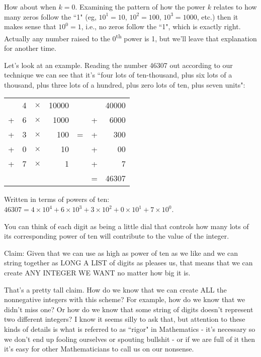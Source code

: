 \documentclass{article}
\begin{document}
How about when $k=0$.
Examining the pattern of how the power $k$ relates to how many zeros follow the ``1"
(eg, $10^1=10$, $10^2=100$, $10^3=1000$,
etc.) then it makes sense that $10^0=1$,
i.e., no zeros follow the ``1", which is exactly right.
Actually any number raised to the 0\textsuperscript{th} power is 1,
but we'll leave that explanation for another time.

Let's look at an example.
Reading the number 46307 out according to our technique we can see
that it's ``four lots of ten-thousand,
plus six lots of a thousand, plus three lots of a hundred,
plus zero lots of ten, plus seven units":

\begin{center}
\begin{tabular}{r r r r c r r}
\phantom  & 4 & $\times$ & 10000 & \phantom & \phantom & 40000\\
+ & 6 & $\times$ & 1000  & \phantom & + & 6000\\
+ & 3 & $\times$ & 100 & \; \; = \; \; & + & 300\\
+ & 0 & $\times$ & 10 & \phantom & + & 00\\
+ & 7 & $\times$ & 1 & \phantom & + & 7\\
\cline{6-7}
\phantom & \phantom & \phantom & \phantom & \phantom & = & 46307
\end{tabular}
\end{center}

Written in terms of powers of ten: $46307=4\times10^4+6\times10^3+3\times10^2+0\times10^1+7\times10^0$.

You can think of each digit as being a little dial that controls how many lots
of its corresponding power of ten will contribute to the value of the integer.

Claim: Given that we can use as high as power of ten as we like
and we can string together as LONG A LIST of digits as pleases us,
that means that we can create ANY INTEGER WE WANT no matter how big it is.

That's a pretty tall claim.
How do we know that we can create ALL the nonnegative
integers with this scheme? For example,
how do we know that we didn't miss one? Or how do we know that some string of
digits doesn't represent two different integers? I know it seems silly to ask that,
but attention to these kinds of details is what is referred to as ``rigor"
in Mathematics - it's necessary so we don't end up fooling ourselves or spouting
bullshit - or if we are full of it then it's easy
for other Mathematicians to call us on our nonsense.
\end{document}
